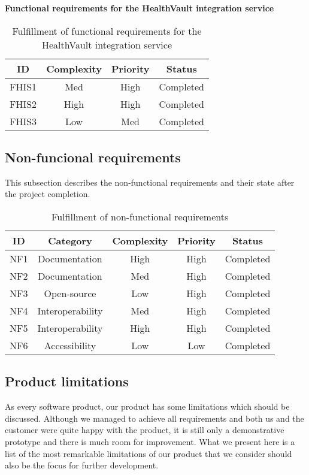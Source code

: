 \textbf{Functional requirements for the HealthVault integration service}

\begin{table}[H]
\begin{center}
\begin{tabular}{ | c | c | c | c |}
  \hline
  \textbf{ID} & \textbf{Complexity} & \textbf{Priority} & \textbf{Status} \\
  \hline\noalign{\smallskip}\hline
  FHIS1	& Med   & High & Completed \\
  FHIS2	& High  & High & Completed \\
  FHIS3	& Low   & Med  & Completed \\
  \hline
\end{tabular}
\end{center}
\caption{Fulfillment of functional requirements for the HealthVault integration service}
\label{table:fulfillemntweightservice}
\end{table}

\subsection{Non-funcional requirements}
This subsection describes the non-functional requirements and their state after the project completion. 

\begin{table}[H]
\begin{center}
\begin{tabular}{ | c | c | c | c | c |}
  \hline
  ID & Category & Complexity & Priority & Status\\
  \hline\noalign{\smallskip}\hline
  NF1 & Documentation		& High 	& High	& Completed \\
  NF2 & Documentation		& Med 	& High	& Completed \\
  NF3 & Open-source			& Low 	& High	& Completed \\
  NF4 & Interoperability	& Med	& High	& Completed \\
  NF5 & Interoperability	& High	& High	& Completed \\
  NF6 & Accessibility		& Low	& Low	&  Completed \\
  \hline
\end{tabular}
\end{center}
\caption{Fulfillment of non-functional requirements}
\label{table:fullfilmentnonfunctionalreq}
\end{table} 
\fi

\subsection{Product limitations}
As every software product, our product has some limitations which should be discussed.
Although we managed to achieve all requirements and both us and the customer were quite happy
with the product, it is still only a demonstrative prototype and there is much room for improvement.
What we present here is a list of the most remarkable limitations of our product that
we consider should also be the focus for further development.

